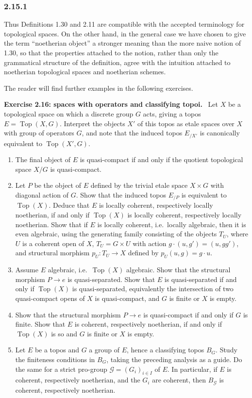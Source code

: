 \documentclass[11pt]{article}
\newcommand{\Top}{\operatorname{Top}}
\newcommand{\ie}{i.e.\ }
\newenvironment{remarktext}[1]{\par\medskip\noindent\textbf{#1.}\ }{\par\medskip}
\begin{document}
\subsubsection*{2.15.1}
Thus Definitions 1.30 and 2.11 are compatible with the accepted terminology for topological spaces. On the other hand, in the general case we have chosen to give the term ``noetherian object'' a stronger meaning than the more naive notion of 1.30, so that the properties attached to the notion, rather than only the grammatical structure of the definition, agree with the intuition attached to noetherian topological spaces and noetherian schemes.

The reader will find further examples in the following exercises.

\begin{remarktext}{Exercise 2.16: spaces with operators and classifying topoi}
Let \(X\) be a topological space on which a discrete group \(G\) acts, giving a topos \(E=\Top(X,G)\). Interpret the objects \(X'\) of this topos as etale spaces over \(X\) with group of operators \(G\), and note that the induced topos \(E_{/X'}\) is canonically equivalent to \(\Top(X',G)\).
\begin{enumerate}[label=\alph*)]
\item The final object of \(E\) is quasi-compact if and only if the quotient topological space \(X/G\) is quasi-compact.
\item Let \(P\) be the object of \(E\) defined by the trivial etale space \(X\times G\) with diagonal action of \(G\). Show that the induced topos \(E_{/P}\) is equivalent to \(\Top(X)\). Deduce that \(E\) is locally coherent, respectively locally noetherian, if and only if \(\Top(X)\) is locally coherent, respectively locally noetherian. Show that if \(E\) is locally coherent, \ie locally algebraic, then it is even algebraic, using the generating family consisting of the objects \(T_U\), where \(U\) is a coherent open of \(X\), \(T_U=G\times U\) with action \(g\cdot(u,g')=(u,gg')\), and structural morphism \(p_U:T_U\to X\) defined by \(p_U(u,g)=g\cdot u\).
\item Assume \(E\) algebraic, \ie \(\Top(X)\) algebraic. Show that the structural morphism \(P\to e\) is quasi-separated. Show that \(E\) is quasi-separated if and only if \(\Top(X)\) is quasi-separated, equivalently the intersection of two quasi-compact opens of \(X\) is quasi-compact, and \(G\) is finite or \(X\) is empty.
\item Show that the structural morphism \(P\to e\) is quasi-compact if and only if \(G\) is finite. Show that \(E\) is coherent, respectively noetherian, if and only if \(\Top(X)\) is so and \(G\) is finite or \(X\) is empty.
\item Let \(E\) be a topos and \(G\) a group of \(E\), hence a classifying topos \(B_G\). Study the finiteness conditions in \(B_G\), taking the preceding analysis as a guide. Do the same for a strict pro-group \(\mathcal{G}=(G_i)_{i\in I}\) of \(E\). In particular, if \(E\) is coherent, respectively noetherian, and the \(G_i\) are coherent, then \(B_{\mathcal{G}}\) is coherent, respectively noetherian.
\end{enumerate}
\end{remarktext}
\end{document}
